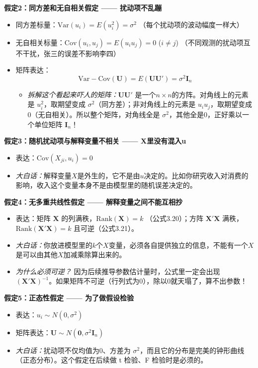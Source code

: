 \documentclass[12pt,a4paper]{ctexart}
\newcommand{\vect}[1]{\mathbf{#1}}
\newcommand{\mat}[1]{\mathbf{#1}}
\begin{document}
\noindent\textbf{假定2：同方差和无自相关假定 —— 扰动项不乱蹦}
\begin{itemize}
\item 同方差标量：\(\mathrm{Var}(u_i) = E(u_i^2) = \sigma^2\) （每个扰动项的波动幅度一样大）
\item 无自相关标量：\(\mathrm{Cov}(u_i, u_j) = E(u_i u_j) = 0\) (\(i \neq j\)) （不同观测的扰动项互不干扰，张三的误差不影响李四）
\item 矩阵表达：
\begin{equation}
\mathrm{Var-Cov}(\vect{U}) = E(\vect{U}\vect{U}') = \sigma^2 \mat{I}_n \tag{3.16, 3.17}
\end{equation}
\begin{itemize}
\item \emph{拆解这个看起来吓人的矩阵：}\(\vect{U}\vect{U}'\) 是一个\(n\times n\)的方阵。对角线上的元素是 \(u_i^2\)，取期望变成 \(\sigma^2\)（同方差）；非对角线上的元素是 \(u_i u_j\)，取期望变成0（无自相关）。所以整个矩阵，对角线全是 \(\sigma^2\)，其他全是0，正好乘以一个单位矩阵 \(\mat{I}_n\)！
\end{itemize}
\end{itemize}

\noindent\textbf{假定3：随机扰动项与解释变量不相关 —— X里没有混入u}
\begin{itemize}
\item 表达：\(\mathrm{Cov}(X_{ji}, u_i) = 0\)
\item \emph{大白话：}解释变量\(X\)是外生的，它不是由\(u\)决定的。比如你研究收入对消费的影响，收入这个变量本身不是由模型里的随机误差决定的。
\end{itemize}

\noindent\textbf{假定4：无多重共线性假定 —— 解释变量之间不能互相抄}
\begin{itemize}
\item 表达：矩阵 \(\mat{X}\) 的列满秩，\(\mathrm{Rank}(\mat{X}) = k\) （公式3.20）；方阵 \(\mat{X}'\mat{X}\) 满秩，\(\mathrm{Rank}(\mat{X}'\mat{X}) = k\) 且可逆（公式3.21）。
\item \emph{大白话：}你放进模型里的\(k\)个\(X\)变量，必须各自提供独立的信息，不能有一个\(X\)是可以由其他\(X\)加减乘除算出来的。
\item \emph{为什么必须可逆？} 因为后续推导参数估计量时，公式里一定会出现 \((\mat{X}'\mat{X})^{-1}\)。如果矩阵不可逆（行列式为0），除以0就天塌了，算不出参数！
\end{itemize}

\noindent\textbf{假定5：正态性假定 —— 为了做假设检验}
\begin{itemize}
\item 表达：\(u_i \sim N(0, \sigma^2)\)
\item 矩阵表达：\(\vect{U} \sim N(\vect{0}, \sigma^2 \mat{I}_n)\)
\item \emph{大白话：}扰动项不仅均值为0、方差为 \(\sigma^2\)，而且它的分布是完美的钟形曲线（正态分布）。这个假定在后续做 t 检验、F 检验时是必须的。
\end{itemize}
\end{document}
